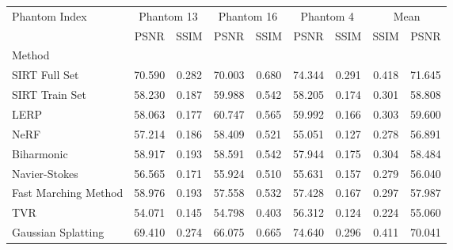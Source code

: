 \begin{tabular}{|l|cc|cc|cc|cc|}
\toprule
Phantom Index & \multicolumn{2}{c|}{Phantom 13} & \multicolumn{2}{c|}{Phantom 16} & \multicolumn{2}{c|}{Phantom 4} & \multicolumn{2}{c|}{Mean} \\
 & PSNR & SSIM & PSNR & SSIM & PSNR & SSIM & SSIM & PSNR \\
Method &  &  &  &  &  &  &  &  \\
\midrule
SIRT Full Set & 70.590 & 0.282 & 70.003 & 0.680 & 74.344 & 0.291 & 0.418 & 71.645 \\
SIRT Train Set & 58.230 & 0.187 & 59.988 & 0.542 & 58.205 & 0.174 & 0.301 & 58.808 \\
LERP & 58.063 & 0.177 & 60.747 & 0.565 & 59.992 & 0.166 & 0.303 & 59.600 \\
NeRF & 57.214 & 0.186 & 58.409 & 0.521 & 55.051 & 0.127 & 0.278 & 56.891 \\
Biharmonic & 58.917 & 0.193 & 58.591 & 0.542 & 57.944 & 0.175 & 0.304 & 58.484 \\
Navier-Stokes & 56.565 & 0.171 & 55.924 & 0.510 & 55.631 & 0.157 & 0.279 & 56.040 \\
Fast Marching Method & 58.976 & 0.193 & 57.558 & 0.532 & 57.428 & 0.167 & 0.297 & 57.987 \\
TVR & 54.071 & 0.145 & 54.798 & 0.403 & 56.312 & 0.124 & 0.224 & 55.060 \\
Gaussian Splatting & 69.410 & 0.274 & 66.075 & 0.665 & 74.640 & 0.296 & 0.411 & 70.041 \\
\bottomrule
\end{tabular}
